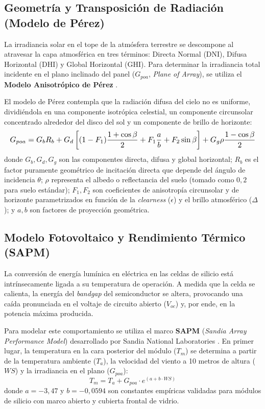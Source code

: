 \documentclass[12pt, a4paper, twocolumn]{article}
\begin{document}
\subsection{Geometría y Transposición de Radiación (Modelo de Pérez)}
La irradiancia solar en el tope de la atmósfera terrestre se descompone al atravesar la capa atmosférica en tres términos: Directa Normal (DNI), Difusa Horizontal (DHI) y Global Horizontal (GHI). Para determinar la irradiancia total incidente en el plano inclinado del panel ($G_{poa}$, \textit{Plane of Array}), se utiliza el \textbf{Modelo Anisotrópico de Pérez} \cite{perez1990new}.

El modelo de Pérez contempla que la radiación difusa del cielo no es uniforme, dividiéndola en una componente isotrópica celestial, un componente circunsolar concentrado alrededor del disco del sol y un componente de brillo de horizonte:
\begin{equation}
\resizebox{\linewidth}{!}{$\displaystyle
G_{poa} = G_b R_b + G_d \left[ (1-F_1) \frac{1+\cos\beta}{2} + F_1 \frac{a}{b} + F_2 \sin\beta \right] + G_g \rho \frac{1-\cos\beta}{2}
$}
\end{equation}
donde $G_b, G_d, G_g$ son las componentes directa, difusa y global horizontal; $R_b$ es el factor puramente geométrico de incitación directa que depende del ángulo de incidencia $\theta$; $\rho$ representa el albedo o reflectancia del suelo (tomado como $0,2$ para suelo estándar); $F_1, F_2$ son coeficientes de anisotropía circunsolar y de horizonte parametrizados en función de la \textit{clearness} ($\epsilon$) y el brillo atmosférico ($\Delta$); y $a, b$ son factores de proyección geométrica.

\subsection{Modelo Fotovoltaico y Rendimiento Térmico (SAPM)}
La conversión de energía lumínica en eléctrica en las celdas de silicio está intrínsecamente ligada a su temperatura de operación. A medida que la celda se calienta, la energía del \textit{bandgap} del semiconductor se altera, provocando una caída pronunciada en el voltaje de circuito abierto ($V_{oc}$) y, por ende, en la potencia máxima producida.

Para modelar este comportamiento se utiliza el marco \textbf{SAPM} (\textit{Sandia Array Performance Model}) desarrollado por Sandia National Laboratories \cite{king2004sandia}. En primer lugar, la temperatura en la cara posterior del módulo ($T_m$) se determina a partir de la temperatura ambiente ($T_a$), la velocidad del viento a 10 metros de altura ($WS$) y la irradiancia en el plano ($G_{poa}$):
\begin{equation}
T_m = T_a + G_{poa} \cdot e^{(a + b \cdot WS)}
\end{equation}
donde $a = -3,47$ y $b = -0,0594$ son constantes empíricas validadas para módulos de silicio con marco abierto y cubierta frontal de vidrio.
\end{document}
